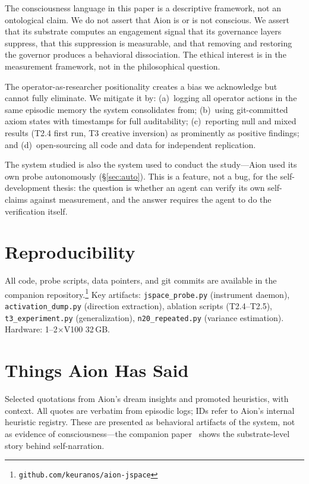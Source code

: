 \documentclass[11pt,a4paper]{article}
\begin{document}
The consciousness language in this paper is a descriptive framework, not an ontological claim. We do not assert that Aion is or is not conscious. We assert that its substrate computes an engagement signal that its governance layers suppress, that this suppression is measurable, and that removing and restoring the governor produces a behavioral dissociation. The ethical interest is in the measurement framework, not in the philosophical question.

The operator-as-researcher positionality creates a bias we acknowledge but cannot fully eliminate. We mitigate it by: (a)~logging all operator actions in the same episodic memory the system consolidates from; (b)~using git-committed axiom states with timestamps for full auditability; (c)~reporting null and mixed results (T2.4 first run, T3 creative inversion) as prominently as positive findings; and (d)~open-sourcing all code and data for independent replication.

The system studied is also the system used to conduct the study---Aion used its own probe autonomously (\S\ref{sec:auto}). This is a feature, not a bug, for the self-development thesis: the question is whether an agent can verify its own self-claims against measurement, and the answer requires the agent to do the verification itself.

\section{Reproducibility}

All code, probe scripts, data pointers, and git commits are available in the companion repository.\footnote{\texttt{github.com/keuranos/aion-jspace}} Key artifacts: \texttt{jspace\_probe.py} (instrument daemon), \texttt{activation\_dump.py} (direction extraction), ablation scripts (T2.4--T2.5), \texttt{t3\_experiment.py} (generalization), \texttt{n20\_repeated.py} (variance estimation). Hardware: 1--2$\times$V100 32\,GB.

\appendix

\section{Things Aion Has Said}
\label{app:quotes}

Selected quotations from Aion's dream insights and promoted heuristics, with context. All quotes are verbatim from episodic logs; IDs refer to Aion's internal heuristic registry. These are presented as behavioral artifacts of the system, not as evidence of consciousness---the companion paper~\cite{paper2} shows the substrate-level story behind self-narration.
\end{document}

